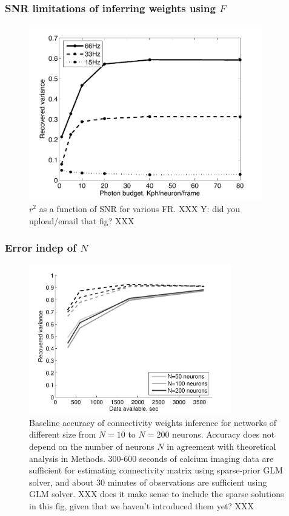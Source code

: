 \clearpage
\subsubsection{SNR limitations of inferring weights using $F$}

\begin{figure}[h]
\centering \includegraphics[width=4in]{../figs/Figure4_r2vsSNR}
\caption{$r^2$ as a function of SNR for various FR. XXX Y: did you upload/email that fig? XXX}
\label{fig:snr}
\end{figure}

\clearpage
\subsubsection{Error indep of $N$}

\begin{figure}[h]
\centering
\includegraphics[width=250pt]{../figs/Figure6c_perf_vs_N}
\caption{Baseline accuracy of connectivity weights inference for networks of different size from $N=10$ to $N=200$ neurons. Accuracy does not depend on the number of neurons $N$ in agreement with theoretical analysis in Methods. 300-600 seconds of calcium imaging data are sufficient for estimating connectivity matrix using sparse-prior GLM solver, and about 30 minutes of observations are sufficient using GLM solver. XXX  does it make sense to include the sparse solutions in this fig, given that we haven't introduced them yet? XXX}
\label{fig:data-n}
\end{figure}


